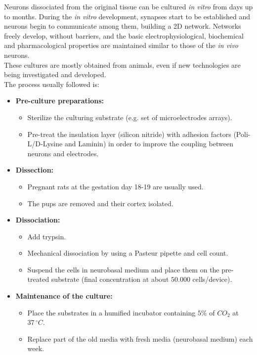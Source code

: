 Neurons dissociated from the original tissue can be cultured \textit{in vitro} from
days up to months. During the \textit{in vitro} development, synapses start to be
established and neurons begin to communicate among them, building a 2D
network. Networks freely develop, without barriers, and the basic
electrophysiological, biochemical and pharmacological properties are
maintained similar to those of the \textit{in vivo} neurons.\\
These cultures are mostly obtained from animals, even if new technologies
are being investigated and developed.\\
The process usually followed is:
\begin{itemize}
    \item \textbf{Pre-culture preparations:}
          \begin{itemize}
              \item Sterilize the culturing substrate (e.g. set of
                    microelectrodes arrays).
              \item Pre-treat the insulation layer (silicon nitride) with
                    adhesion factors (Poli-L/D-Lysine and Laminin) in order to improve the
                    coupling between neurons and electrodes.
          \end{itemize}

    \item \textbf{Dissection:}
          \begin{itemize}
              \item Pregnant rats at the gestation day 18-19 are usually used.
              \item The pups are removed and their cortex isolated.
          \end{itemize}

    \item \textbf{Dissociation:}
          \begin{itemize}
              \item Add trypsin.
              \item Mechanical dissociation by using a Pasteur pipette and cell
                    count.
              \item Suspend the cells in neurobasal medium and place them on the
                    pre-treated substrate (final concentration at about \(50.000\) cells/device).
          \end{itemize}

    \item \textbf{Maintenance of the culture:}
          \begin{itemize}
              \item Place the substrates in a humified incubator containing \(5\%\)
                    of \(CO_2\) at \(37\,{}^{\circ}C\).
              \item Replace part of the old media with fresh media (neurobasal
                    medium) each week.
          \end{itemize}
\end{itemize}

